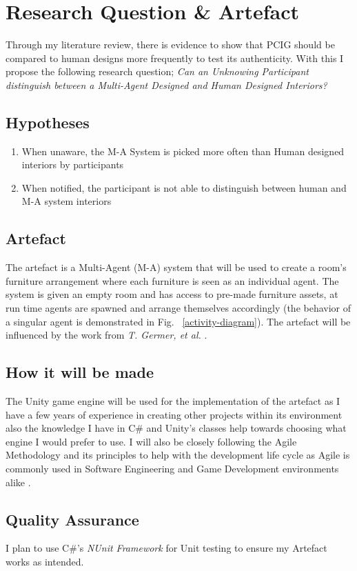 \section{Research Question \& Artefact}
Through my literature review, there is evidence to show that PCIG should be compared to human designs more frequently to test its authenticity. With this I propose the following research question; \textit{Can an Unknowing Participant distinguish between a Multi-Agent Designed and Human Designed Interiors?}

\subsection{Hypotheses}
\begin{enumerate}
    \item When unaware, the M-A System is picked more often than Human designed interiors by participants
    \item When notified, the participant is not able to distinguish between human and M-A system interiors
\end{enumerate}

\subsection{Artefact}
The artefact is a Multi-Agent (M-A) system that will be used to create a room's furniture arrangement where each furniture is seen as an individual agent. The system is given an empty room and has access to pre-made furniture assets, at run time agents are spawned and arrange themselves accordingly (the behavior of a singular agent is demonstrated in Fig. ~\ref{activity-diagram}). The artefact will be influenced by the work from \textit{T. Germer, et al.} \cite{real-time-walkthroughs}.


\subsection{How it will be made} 
The Unity game engine\cite{unity} will be used for the implementation of the artefact as I have a few years of experience in creating other projects within its environment also the knowledge I have in C\# and Unity's classes help towards choosing what engine I would prefer to use.
I will also be closely following the Agile Methodology and its principles to help with the development life cycle as Agile is commonly used in Software Engineering and Game Development environments alike \cite{game-dev-agile}.

\subsection{Quality Assurance} 
I plan to use C\#'s \textit{NUnit Framework} \cite{nunit-framework} for Unit testing to ensure my Artefact works as intended.
